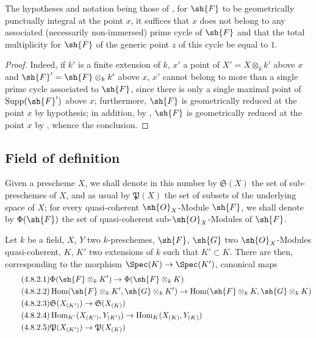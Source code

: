 \begin{proposition}[4.7.13]
\label{IV.4.7.13}
The hypotheses and notation being those of , for $\sh{F}$ to be geometrically punctually integral at the point $x$, it suffices that $x$ does not belong to any associated (necessarily non-immersed) prime cycle of $\sh{F}$ and that the total multiplicity for $\sh{F}$ of the generic point $z$ of this cycle be equal to $1$.
\end{proposition}

\begin{proof}
Indeed, if $k'$ is a finite extension of $k$, $x'$ a point of $X'=X\otimes_k k'$ above $x$ and $\sh{F}'=\sh{F}\otimes_k k'$ above $x$, $x'$ cannot belong to more than a single prime cycle associated to $\sh{F}$, since there is only a single maximal point of $\operatorname{Supp}(\sh{F}')$ above $x$; furthermore, $\sh{F}$ is geometrically reduced at the point $x$ by hypothesis; in addition, by , $\sh{F}$ is geometrically reduced at the point $x$ by , whence the conclusion.
\end{proof}


\subsection{Field of definition}
\label{subsection:IV.4.8}

\begin{env}[4.8.1]
\label{IV.4.8.1}
Given a prescheme $X$, we shall denote in this number by $\mathfrak{S}(X)$ the set of sub-preschemes of $X$, and as usual by $\mathfrak{P}(X)$ the set of subsets of the underlying space of $X$; for every quasi-coherent $\sh{O}_X$-Module $\sh{F}$, we shall denote by $\Phi(\sh{F})$ the set of quasi-coherent sub-$\sh{O}_X$-Modules of $\sh{F}$.
\end{env}

\begin{env}[4.8.2]
\label{IV.4.8.2}
Let $k$ be a field, $X$, $Y$ two $k$-preschemes, $\sh{F}$, $\sh{G}$ two $\sh{O}_X$-Modules quasi-coherent, $K$, $K'$ two extensions of $k$ such that $K'\subset K$.
There are then, corresponding to the morphism $\Spec(K)\to\Spec(K')$, canonical maps
\begin{align}
\tag{4.8.2.1}
  & \Phi(\sh{F}\otimes_k K') \to \Phi(\sh{F}\otimes_k K) \\
\tag{4.8.2.2}
  & \operatorname{Hom}(\sh{F}\otimes_k K', \sh{G}\otimes_k K') \to \operatorname{Hom}(\sh{F}\otimes_k K, \sh{G}\otimes_k K) \\
\tag{4.8.2.3}
  & \mathfrak{S}(X_{(K')}) \to \mathfrak{S}(X_{(K)}) \\
\tag{4.8.2.4}
  & \operatorname{Hom}_{K'}(X_{(K')}, Y_{(K')}) \to \operatorname{Hom}_K(X_{(K)}, Y_{(K)}) \\
\tag{4.8.2.5}
  & \mathfrak{P}(X_{(K')}) \to \mathfrak{P}(X_{(K)})
\end{align}
\end{env}

